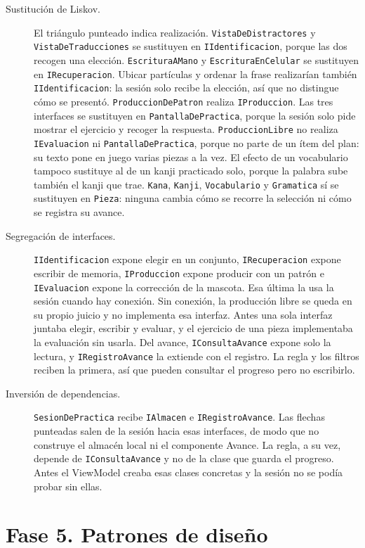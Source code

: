 \documentclass[11pt]{article}
\begin{document}
\begin{description}
  \item[Sustitución de Liskov.] El triángulo punteado indica realización. \texttt{VistaDeDistractores} y \texttt{VistaDeTraducciones} se sustituyen en \texttt{IIdentificacion}, porque las dos recogen una elección. \texttt{EscrituraAMano} y \texttt{EscrituraEnCelular} se sustituyen en \texttt{IRecuperacion}. Ubicar partículas y ordenar la frase realizarían también \texttt{IIdentificacion}: la sesión solo recibe la elección, así que no distingue cómo se presentó. \texttt{ProduccionDePatron} realiza \texttt{IProduccion}. Las tres interfaces se sustituyen en \texttt{PantallaDePractica}, porque la sesión solo pide mostrar el ejercicio y recoger la respuesta. \texttt{ProduccionLibre} no realiza \texttt{IEvaluacion} ni \texttt{PantallaDePractica}, porque no parte de un ítem del plan: su texto pone en juego varias piezas a la vez. El efecto de un vocabulario tampoco sustituye al de un kanji practicado solo, porque la palabra sube también el kanji que trae. \texttt{Kana}, \texttt{Kanji}, \texttt{Vocabulario} y \texttt{Gramatica} sí se sustituyen en \texttt{Pieza}: ninguna cambia cómo se recorre la selección ni cómo se registra su avance.
  \item[Segregación de interfaces.] \texttt{IIdentificacion} expone elegir en un conjunto, \texttt{IRecuperacion} expone escribir de memoria, \texttt{IProduccion} expone producir con un patrón e \texttt{IEvaluacion} expone la corrección de la mascota. Esa última la usa la sesión cuando hay conexión. Sin conexión, la producción libre se queda en su propio juicio y no implementa esa interfaz. Antes una sola interfaz juntaba elegir, escribir y evaluar, y el ejercicio de una pieza implementaba la evaluación sin usarla. Del avance, \texttt{IConsultaAvance} expone solo la lectura, y \texttt{IRegistroAvance} la extiende con el registro. La regla y los filtros reciben la primera, así que pueden consultar el progreso pero no escribirlo.
  \item[Inversión de dependencias.] \texttt{SesionDePractica} recibe \texttt{IAlmacen} e \texttt{IRegistroAvance}. Las flechas punteadas salen de la sesión hacia esas interfaces, de modo que no construye el almacén local ni el componente Avance. La regla, a su vez, depende de \texttt{IConsultaAvance} y no de la clase que guarda el progreso. Antes el ViewModel creaba esas clases concretas y la sesión no se podía probar sin ellas.
\end{description}

\section{Fase 5. Patrones de diseño}
\end{document}
